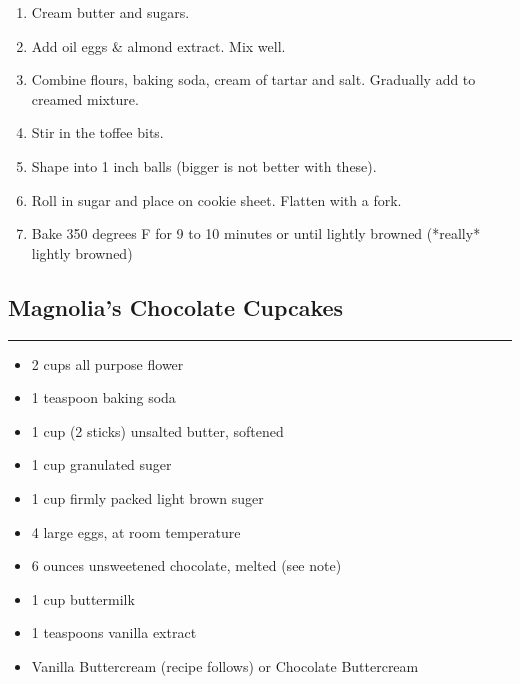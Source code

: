\documentclass{article}
\begin{document}
\begin{enumerate}
    \item 
        Cream butter and sugars. 
    \item 
        Add oil eggs \& almond extract. Mix well.
    \item 
        Combine flours, baking soda, cream of tartar and salt. Gradually add to creamed mixture. 
    \item 
        Stir in the toffee bits.
    \item 
        Shape into 1 inch balls (bigger is not better with these). 
    \item 
        Roll in sugar and place on cookie sheet. Flatten with a fork.
    \item 
        Bake 350 degrees F for 9 to 10 minutes or until lightly browned (*really* lightly browned)
\end{enumerate}
\newpage

\subsection{Magnolia's Chocolate Cupcakes} 
\noindent\rule[0.5ex]{\linewidth}{1pt}

\begin{framed}
    \begin{itemize}
        \item 2 cups all purpose flower
        \item 1 teaspoon baking soda
        \item 1 cup (2 sticks) unsalted butter, softened
        \item 1 cup granulated suger
        \item 1 cup firmly packed light brown suger
        \item 4 large eggs, at room temperature
        \item 6 ounces unsweetened chocolate, melted (see note)
        \item 1 cup buttermilk
        \item 1 teaspoons vanilla extract
        \item Vanilla Buttercream (recipe follows) or Chocolate Buttercream
    \end{itemize}
\end{framed}
\end{document}
